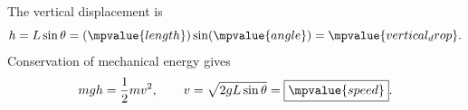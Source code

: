 The vertical displacement is
\[
  h=L\sin\theta=(\mpvalue{length})\sin(\mpvalue{angle})=\mpvalue{vertical_drop}.
\]
Conservation of mechanical energy gives
\[
  mgh=\frac12mv^2,
  \qquad
  v=\sqrt{2gL\sin\theta}=\boxed{\mpvalue{speed}}.
\]
